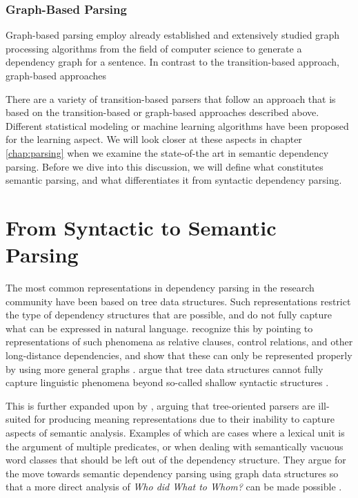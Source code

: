 \subsubsection{Graph-Based Parsing}
Graph-based parsing employ already established and extensively studied graph processing algorithms from the field of computer science to generate a dependency graph for a sentence. In contrast to the transition-based approach, graph-based approaches 

There are a variety of transition-based parsers that follow an approach that is based on the transition-based or graph-based approaches described above. Different statistical modeling or machine learning algorithms have been proposed for the learning aspect. We will look closer at these aspects in chapter \ref{chap:parsing} when we examine the state-of-the art in semantic dependency parsing. Before we dive into this discussion, we will define what constitutes semantic parsing, and what differentiates it from syntactic dependency parsing.

\section{From Syntactic to Semantic Parsing}
\label{syntactic-semantic}

The most common representations in dependency parsing in the research community have been based on tree data structures. Such representations restrict the type of dependency structures that are possible, and do not fully capture what can be expressed in natural language. \citeauthor{Hudson:90} recognize this by pointing to representations of such phenomena as relative clauses, control relations, and other long-distance dependencies, and show that these can only be represented properly by using more general graphs \cite{Hudson:90}. \citeauthor{Sagae:Tsuji:08} argue that tree data structures cannot fully capture linguistic phenomena beyond so-called shallow syntactic structures \cite{Sagae:Tsuji:08}.

This is further expanded upon by \citeauthor{Oepen:14}, arguing that tree-oriented parsers are ill-suited for producing meaning representations due to their inability to capture aspects of semantic analysis. Examples of which are cases where a lexical unit is the argument of multiple predicates, or when dealing with semantically vacuous word classes that should be left out of the dependency structure. They argue for the move towards semantic dependency parsing using graph data structures so that a more direct analysis of \textit{Who did What to Whom?} can be made possible \cite{Oepen:14}.



